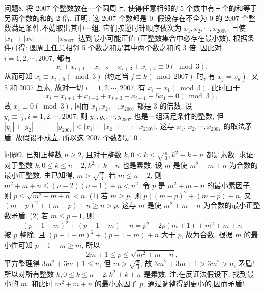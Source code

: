 问题8. 将 2007 个整数放在一个圆周上, 使得任意相邻的 5 个数中有三个的和等于另两个数的和的 2 倍.
证明: 这 2007 个数都是 0. 
假设存在不全为 0 的 2007 个整数满足条件,不妨取出其中一组, 它们按逆时针顺序依次为 $x_1, x_2, \cdots, x_{2007}$, 且使 $\left|x_1\right|+\left|x_2\right|+\cdots+\left|x_{2007}\right|$ 达到最小可能正值 (正整数集合中必存在最小数).
根据条件可得: 圆周上任意相邻 5 个数之和是其中两个数之和的 3 倍, 因此对 $i=1,2, \cdots, 2007$, 都有
$$
x_i+x_{i+1}+x_{i+2}+x_{i+3}+x_{i+4} \equiv 0(\bmod 3),
$$
从而可知 $x_i \equiv x_{i+5}(\bmod 3)$ (约定当 $j \equiv k(\bmod 2007)$ 时, 有 $\left.x_j=x_k\right)$. 又 5 和 2007 互素, 故对一切 $i=1,2, \cdots, 2007$, 有 $x_i \equiv x_1(\bmod 3)$. 此时由于
$$
x_i+x_{i+1}+x_{i+2}+x_{i+3}+x_{i+4} \equiv 5 x_1 \equiv 0(\bmod 3),
$$
故 $x_1 \equiv 0(\bmod 3)$, 因而 $x_1, x_2, \cdots, x_{2007}$ 都是 3 的倍数.
设 $y_i \equiv \frac{x_i}{3}, i=1,2, \cdots, 2007$, 则 $y_1, y_2, \cdots, y_{2007}$ 也是一组满足条件的整数, 但 $\left|y_1\right|+\left|y_2\right|+\cdots+\left|y_{2007}\right|<\left|x_1\right|+\left|x_2\right|+\cdots+\left|x_{2007}\right|$, 这与 $x_1$, $x_2, \cdots, x_{2007}$ 的取法矛盾.
故假设不成立.
所以这 2007 个数都是 0 .



问题9. 已知正整数 $n \geqslant 2$, 且对于整数 $k, 0 \leqslant k \leqslant \sqrt{\frac{n}{3}}, k^2+k+n$ 都是素数.
求证: 对于整数 $k, 0 \leqslant k \leqslant n-2, k^2+k+n$ 也是素数.
设 $m$ 是使 $m^2+m+n$ 为合数的最小正整数, 由已知得, $m>\sqrt{\frac{n}{3}}$.
若 $m \leqslant n-2$, 则 $m^2+m+n \leqslant(n-2)(n-1)+n<n^2$.
令 $p$ 是 $m^2+m+n$ 的最小素因子, 则 $p \leqslant \sqrt{m^2+m+n}<n$.
(1) 若 $m \geqslant p$, 则 $p \mid(m-p)^2+(m-p)+n$, 又 $(m-p)^2+(m-p)+ n \geqslant n>p$, 这与 $m$ 是使 $m^2+m+n$ 为合数的最小正整数矛盾.
(2) 若 $m \leqslant p-1$, 则
$$
(p-1-m)^2+(p-1-m)+n=p^2-2 p(m+1)+m^2+m+n
$$
被 $p$ 整除, 且 $(p-1-m)^2+(p-1-m)+n$ 大于 $p$, 故为合数.
根据 $m$ 的最小性可知 $p-1-m \geqslant m$, 所以
$$
2 m+1 \leqslant p \leqslant \sqrt{m^2+m+n},
$$
平方整理得 $3 m^2+3 m+1 \leqslant n$, 但 $m>\sqrt{\frac{n}{3}}$, 故 $3 m^2+3 m+1>3 m^2>n$, 矛盾!
所以对所有整数 $k, 0 \leqslant k \leqslant n-2, k^2+k+n$ 是素数.
注:在反证法假设下, 找到最小的 $m$. 和此时 $m^2+m+n$ 的最小素因子 $p$, 通过调整得到更小的,因而矛盾!


